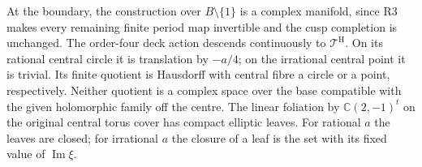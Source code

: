\begin{proposition}\label{push:src:D.2.4}
At the boundary, the construction over \(B\setminus\{1\}\) is a
complex manifold, since R3 makes every remaining finite period map
invertible and the cusp completion is unchanged.
The order-four deck action descends continuously to
\(\mathcal T^{\mathrm H}\). On its rational central circle it is
translation by \(-a/4\); on the irrational central point it is
trivial. Its finite quotient is Hausdorff with central fibre a circle
or a point, respectively. Neither quotient is a complex space over
the base compatible with the given holomorphic family off the centre.
The linear foliation by \(\mathbb C(2,-1)^t\) on the original central
torus cover has compact elliptic leaves. For rational \(a\) the
leaves are closed; for irrational \(a\) the closure of a leaf is the
set with its fixed value of \(\operatorname{Im}\xi\).
\end{proposition}
